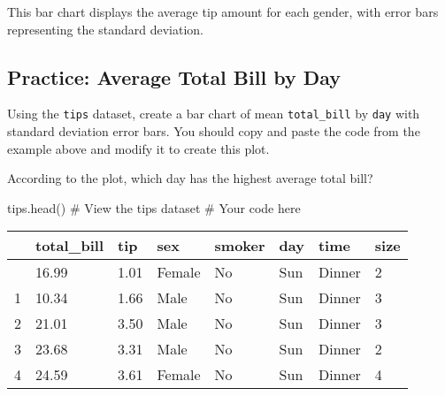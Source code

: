 \documentclass[
  letterpaper,
  DIV=11,
  numbers=noendperiod]{scrreprt}
\newenvironment{Shaded}{\begin{snugshade}}{\end{snugshade}}
\newcommand{\CommentTok}[1]{\textcolor[rgb]{0.37,0.37,0.37}{#1}}
\newcommand{\NormalTok}[1]{\textcolor[rgb]{0.00,0.23,0.31}{#1}}
\begin{document}
This bar chart displays the average tip amount for each gender, with
error bars representing the standard deviation.

\begin{tcolorbox}[enhanced jigsaw, colframe=quarto-callout-tip-color-frame, opacityback=0, titlerule=0mm, bottomrule=.15mm, breakable, leftrule=.75mm, colbacktitle=quarto-callout-tip-color!10!white, title=\textcolor{quarto-callout-tip-color}{\faLightbulb}\hspace{0.5em}{Practice}, rightrule=.15mm, coltitle=black, opacitybacktitle=0.6, colback=white, left=2mm, arc=.35mm, toptitle=1mm, bottomtitle=1mm, toprule=.15mm]

\subsection{Practice: Average Total Bill by
Day}\label{practice-average-total-bill-by-day}

Using the \texttt{tips} dataset, create a bar chart of mean
\texttt{total\_bill} by \texttt{day} with standard deviation error bars.
You should copy and paste the code from the example above and modify it
to create this plot.

According to the plot, which day has the highest average total bill?

\begin{Shaded}
\begin{Highlighting}[]
\NormalTok{tips.head()  }\CommentTok{\# View the tips dataset}
\CommentTok{\# Your code here}
\end{Highlighting}
\end{Shaded}

\begin{longtable}[]{@{}llllllll@{}}
\toprule\noalign{}
& total\_bill & tip & sex & smoker & day & time & size \\
\midrule\noalign{}
\endhead
\bottomrule\noalign{}
\endlastfoot
0 & 16.99 & 1.01 & Female & No & Sun & Dinner & 2 \\
1 & 10.34 & 1.66 & Male & No & Sun & Dinner & 3 \\
2 & 21.01 & 3.50 & Male & No & Sun & Dinner & 3 \\
3 & 23.68 & 3.31 & Male & No & Sun & Dinner & 2 \\
4 & 24.59 & 3.61 & Female & No & Sun & Dinner & 4 \\
\end{longtable}

\end{tcolorbox}
\end{document}

